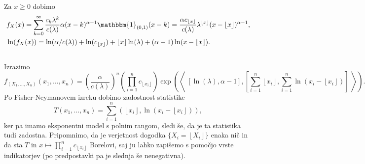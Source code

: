 \documentclass[ letterpaper, titlepage, fleqn]{article}
\newcommand{\adjscalar}[1]{\left\langle\;#1\;\right\rangle}
\newcommand{\ind}{\mathbbm{1}}
\providecommand{\floor}[1]{\left \lfloor #1 \right \rfloor }
\begin{document}
\subsection{}
Za $x\geq0$ dobimo
\begin{equation*}
\begin{aligned}
&f_X(x) = \sum_{k=0}^\infty \frac{c_k\lambda^k}{c(\lambda)}  \alpha (x-k)^{\alpha-1} \ind_{(0,1)}(x-k) 
= \frac{\alpha c_{\floor{x}}}{c(\lambda)} \lambda^{\floor{x}} (x-\floor{x})^{\alpha-1}, \\
&\ln(f_X(x)) = \ln(\alpha/c(\lambda)) + \ln(c_{\floor{x}}) + \floor{x}\ln(\lambda) + (\alpha-1)\ln(x - \floor{x}).
\end{aligned}
\end{equation*}

\subsection{}
Izrazimo
\begin{equation*}
f_{(X_1, \dots, X_n)}(x_1, \dots, x_n) = \left(\frac{\alpha}{c(\lambda)}\right)^n \left(\prod_{i=1}^n c_{\floor{x_i}}\right)
\exp\left(\adjscalar{\left[\ln(\lambda), \alpha-1\right], \left[\sum_{i=1}^n \floor{x_i}, \sum_{i=1}^n \ln(x_i - \floor{x_i})\right]}\right).
\end{equation*}
Po Fisher-Neymanovem izreku dobimo zadostnost statistike 
$$T(x_1, \dots, x_n) = \sum_{i=1}^n (\floor{x_i}, \ln(x_i - \floor{x_i})),$$
ker pa imamo eksponentni model s polnim rangom, sledi še, da je ta statistika tudi zadostna. Pripomnimo, da je verjetnost dogodka $\{X_i = \floor{X_i}\}$ enaka nič in da sta $T$ in $x \mapsto \prod_{i=1}^n c_{\floor{x_i}}$ Borelovi, saj ju lahko zapišemo s pomočjo vrste indikatorjev (po predpostavki pa je slednja še nenegativna).
\end{document}
